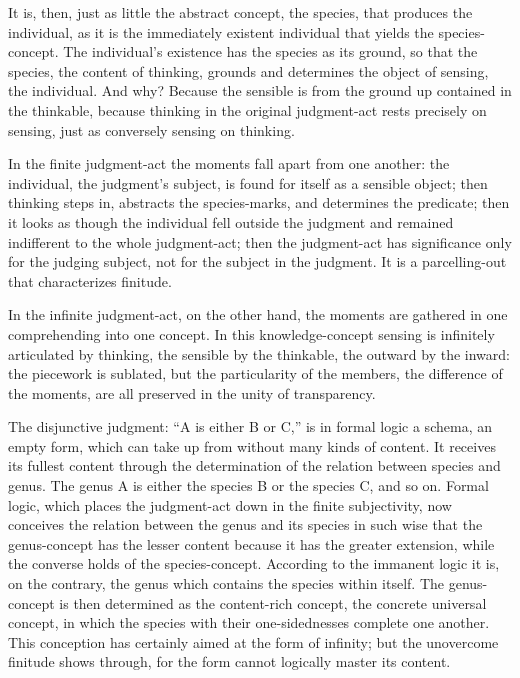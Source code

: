 \documentclass[12pt]{book}
\begin{document}
It is, then, just as little the abstract concept, the species, that
produces the individual, as it is the immediately existent
individual that yields the species-concept. The individual's
existence has the species as its ground, so that the species, the
content of thinking, grounds and determines the object of sensing,
the individual. And why? Because the sensible is from the ground up
contained in the thinkable, because thinking in the original
judgment-act rests precisely on sensing, just as conversely sensing
on thinking.

In the finite judgment-act the moments fall apart from one another:
the individual, the judgment's subject, is found for itself as a
sensible object; then thinking steps in, abstracts the
species-marks, and determines the predicate; then it looks as though
the individual fell outside the judgment and remained indifferent to
the whole judgment-act; then the judgment-act has significance only
for the judging subject, not for the subject in the judgment. It is
a parcelling-out that characterizes finitude.

In the infinite judgment-act, on the other hand, the moments are
gathered in one comprehending into one concept. In this
knowledge-concept sensing is infinitely articulated by thinking, the
sensible by the thinkable, the outward by the inward: the piecework
is sublated, but the particularity of the members, the difference of
the moments, are all preserved in the unity of transparency.

The disjunctive judgment: ``A is either B or C,'' is in formal logic
a schema, an empty form, which can take up from without many kinds
of content. It receives its fullest content through the
determination of the relation between species and genus. The genus A
is either the species B or the species C, and so on. Formal logic,
which places the judgment-act down in the finite subjectivity, now
conceives the relation between the genus and its species in such
wise that the genus-concept has the lesser content because it has
the greater extension, while the converse holds of the
species-concept. According to the immanent logic it is, on the
contrary, the genus which contains the species within itself. The
genus-concept is then determined as the content-rich concept, the
concrete universal concept, in which the species with their
one-sidednesses complete one another. This conception has certainly
aimed at the form of infinity; but the unovercome finitude shows
through, for the form cannot logically master its content.
\end{document}
